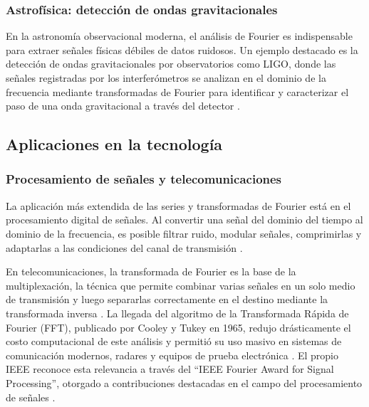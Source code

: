 \subsubsection{Astrofísica: detección de ondas gravitacionales}

En la astronomía observacional moderna, el análisis de Fourier es indispensable para extraer señales físicas débiles de datos ruidosos. Un ejemplo destacado es la detección de ondas gravitacionales por observatorios como LIGO, donde las señales registradas por los interferómetros se analizan en el dominio de la frecuencia mediante transformadas de Fourier para identificar y caracterizar el paso de una onda gravitacional a través del detector \cite{arxiv:ligo-fourier-memoria}.

\subsection{Aplicaciones en la tecnología}
\label{sec:cap01:marco-teorico:tecnologia}

\subsubsection{Procesamiento de señales y telecomunicaciones}

La aplicación más extendida de las series y transformadas de Fourier está en el procesamiento digital de señales. Al convertir una señal del dominio del tiempo al dominio de la frecuencia, es posible filtrar ruido, modular señales, comprimirlas y adaptarlas a las condiciones del canal de transmisión \cite{rjsaonline:fourier-dsp,howard:fourier-comunicacion:2024}.

En telecomunicaciones, la transformada de Fourier es la base de la multiplexación, la técnica que permite combinar varias señales en un solo medio de transmisión y luego separarlas correctamente en el destino mediante la transformada inversa \cite{howard:fourier-comunicacion:2024}. La llegada del algoritmo de la Transformada Rápida de Fourier (FFT), publicado por Cooley y Tukey en 1965, redujo drásticamente el costo computacional de este análisis y permitió su uso masivo en sistemas de comunicación modernos, radares y equipos de prueba electrónica \cite{ieee:fft-implementacion,acm:fft-algoritmos}. El propio IEEE reconoce esta relevancia a través del ``IEEE Fourier Award for Signal Processing'', otorgado a contribuciones destacadas en el campo del procesamiento de señales \cite{wikipedia:ieee-fourier-award}.

